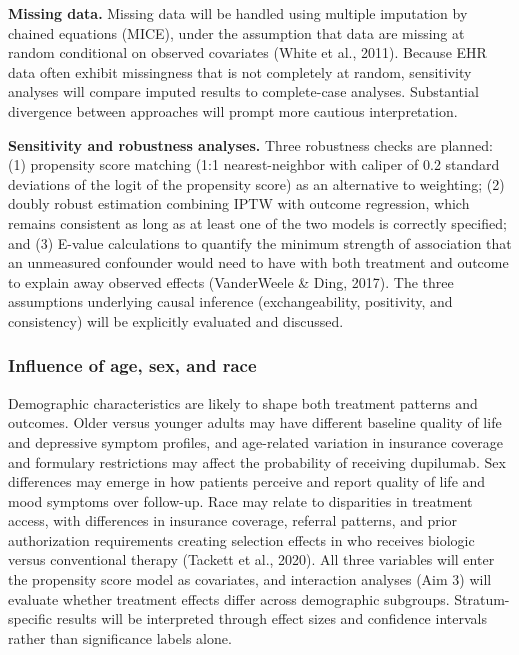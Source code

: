 \documentclass[
]{agujournal2019}
\begin{document}
\textbf{Missing data.} Missing data will be handled using multiple
imputation by chained equations (MICE), under the assumption that data
are missing at random conditional on observed covariates (White et al.,
2011). Because EHR data often exhibit missingness that is not completely
at random, sensitivity analyses will compare imputed results to
complete-case analyses. Substantial divergence between approaches will
prompt more cautious interpretation.

\textbf{Sensitivity and robustness analyses.} Three robustness checks
are planned: (1) propensity score matching (1:1 nearest-neighbor with
caliper of 0.2 standard deviations of the logit of the propensity score)
as an alternative to weighting; (2) doubly robust estimation combining
IPTW with outcome regression, which remains consistent as long as at
least one of the two models is correctly specified; and (3) E-value
calculations to quantify the minimum strength of association that an
unmeasured confounder would need to have with both treatment and outcome
to explain away observed effects (VanderWeele \& Ding, 2017). The three
assumptions underlying causal inference (exchangeability, positivity,
and consistency) will be explicitly evaluated and discussed.

\subsubsection{Influence of age, sex, and
race}\label{influence-of-age-sex-and-race}

Demographic characteristics are likely to shape both treatment patterns
and outcomes. Older versus younger adults may have different baseline
quality of life and depressive symptom profiles, and age-related
variation in insurance coverage and formulary restrictions may affect
the probability of receiving dupilumab. Sex differences may emerge in
how patients perceive and report quality of life and mood symptoms over
follow-up. Race may relate to disparities in treatment access, with
differences in insurance coverage, referral patterns, and prior
authorization requirements creating selection effects in who receives
biologic versus conventional therapy (Tackett et al., 2020). All three
variables will enter the propensity score model as covariates, and
interaction analyses (Aim 3) will evaluate whether treatment effects
differ across demographic subgroups. Stratum-specific results will be
interpreted through effect sizes and confidence intervals rather than
significance labels alone.
\end{document}

